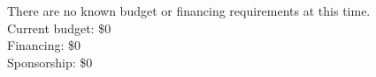 There are no known budget or financing requirements at this time.\\
Current budget: \$0\\
Financing: \$0\\
Sponsorship: \$0\\

\newpage
